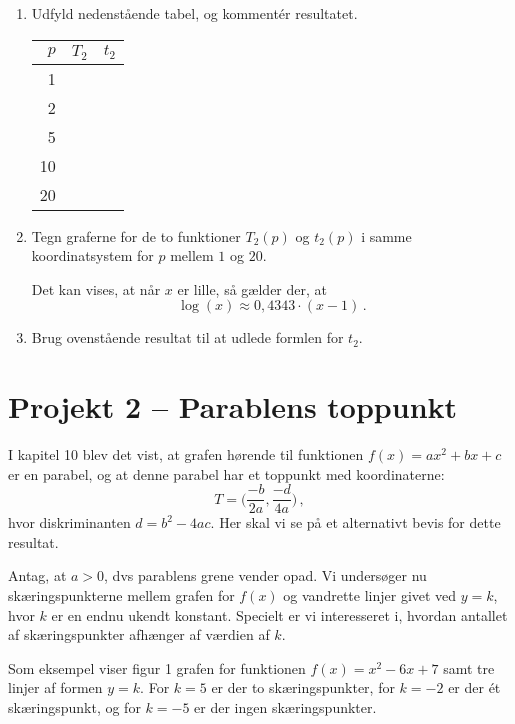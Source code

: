 \documentclass[12pt,oneside,a4paper]{article}
\theoremstyle{plain}
\begin{document}
\begin{enumerate}[label=(\alph*), resume]
    \item Udfyld nedenstående tabel, og kommentér resultatet.
        \begin{center}
            \begin{tabular}{|r|c|l|}
\hline
                $p$ & $T_2$ & $t_2$ \\
                \hline
                1 & & \\
                \hline
                2 & & \\
                \hline
                5 & & \\
                \hline
                10 & & \\
                \hline
                20 & & \\
                \hline
            \end{tabular}
        \end{center}

    \item Tegn graferne for de to funktioner $T_2(p)$ og $t_2(p)$ i samme
        koordinatsystem for $p$ mellem $1$ og $20$.

Det kan vises, at når $x$ er lille, så gælder der, at
        \[
            \log(x) \approx 0,4343 \cdot (x-1) \,.
        \]

    \item Brug ovenstående resultat til at udlede formlen for $t_2$.

\end{enumerate}


\section*{Projekt 2 -- Parablens toppunkt}
I kapitel 10 blev det vist, at grafen hørende til funktionen $f(x) = ax^2 + bx + c$
er en parabel, og at denne parabel har et toppunkt med koordinaterne:
\[
    T = \Big(\frac{-b}{2a}, \frac{-d}{4a}\Big) \,,
\]
hvor diskriminanten $d=b^2-4ac$. Her skal vi se på et alternativt bevis for dette
resultat.

Antag, at $a>0$, dvs parablens grene vender opad. Vi undersøger nu
skæringspunkterne mellem grafen for $f(x)$ og vandrette linjer givet ved $y=k$,
hvor $k$ er en endnu ukendt konstant.  Specielt er vi interesseret i, hvordan
antallet af skæringspunkter afhænger af værdien af $k$.

Som eksempel viser figur 1 grafen for funktionen $f(x) = x^2-6x+7$ samt tre linjer 
af formen $y=k$. For $k=5$ er der to skæringspunkter, for $k=-2$ er der ét skæringspunkt,
og for $k=-5$ er der ingen skæringspunkter.
\end{document}
